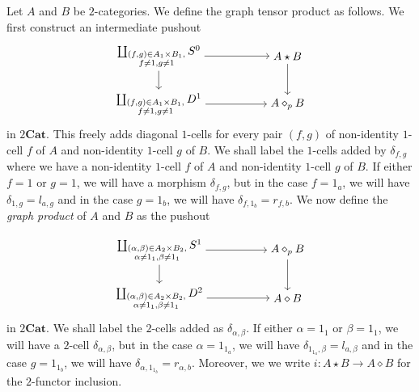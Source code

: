 \documentclass{tac}
\begin{document}
\begin{definition}
Let $A$ and $B$ be $2$-categories. We define the graph tensor product as follows. We first construct an intermediate pushout 
\[
\begin{tikzpicture}[baseline=(current bounding box.center)]
\node (TL) at (0,1.5)
{$\coprod_{\substack{(f,g)\in A_1\times B_1,\\ f\neq 1,g\neq 1}}S^0$};
\node (TR) at (4,1.5)
{$A\star B$};
\node (BL) at (0,0)
{$\coprod_{\substack{(f,g)\in A_1\times B_1,\\ f\neq 1,g\neq 1}}D^1$};
\node (BR) at (4,0)
{$A\diamond_p B$};

\draw[->] (TL) -- (TR);
\draw[->] (TL) -- (BL);
\draw[->] (TR) -- (BR);
\draw[->] (BL) -- (BR);
\end{tikzpicture}
\]
in $2\mathbf{Cat}$. This freely adds diagonal $1$-cells for every pair $(f,g)$ of non-identity $1$-cell $f$ of $A$ and non-identity $1$-cell $g$ of $B$. We shall label the $1$-cells added by $\delta_{f,g}$ where we have a non-identity $1$-cell $f$ of $A$ and non-identity $1$-cell $g$ of $B$. If either $f=1$ or $g=1$, we will have a morphism $\delta_{f,g}$, but in the case $f=1_a$, we will have $\delta_{1,g}=l_{a,g}$ and in the case $g=1_b$, we will have $\delta_{f,1_b}=r_{f,b}$.
We now define the \emph{graph product} of $A$ and $B$ as the pushout 

\[
\begin{tikzpicture}[baseline=(current bounding box.center)]
\node (TL) at (0,1.5)
{$\coprod_{\substack{(\alpha,\beta)\in A_2\times B_2,\\ \alpha\neq 1_1,\beta\neq 1_1}}S^1$};
\node (TR) at (4,1.5)
{$A\diamond_p B$};
\node (BL) at (0,0)
{$\coprod_{\substack{(\alpha,\beta)\in A_2\times B_2,\\ \alpha\neq 1_1,\beta\neq 1_1}}D^2$};
\node (BR) at (4,0)
{$A\diamond B$};

\draw[->] (TL) -- (TR);
\draw[->] (TL) -- (BL);
\draw[->] (TR) -- (BR);
\draw[->] (BL) -- (BR);
\end{tikzpicture}
\]
in $2\mathbf{Cat}$. We shall label the $2$-cells added as $\delta_{\alpha,\beta}$. If either $\alpha=1_1$ or $\beta=1_1$, we will have a $2$-cell $\delta_{\alpha,\beta}$, but in the case $\alpha=1_{1_a}$, we will have $\delta_{1_{1_a},\beta}=l_{a,\beta}$ and in the case $g=1_{1_b}$, we will have $\delta_{\alpha,1_{1_b}}=r_{\alpha,b}$. Moreover, we we write $i:A\star B\to A\diamond B$ for the $2$-functor inclusion.
\end{definition}
\end{document}
